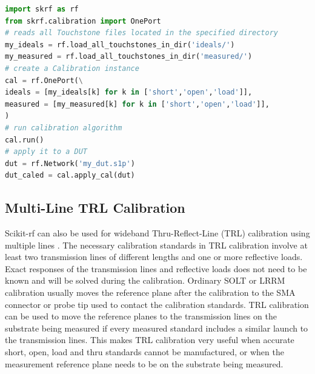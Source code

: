 \documentclass{IEEEjmw}
\begin{document}
\begin{lstlisting}[language=Python]
import skrf as rf
from skrf.calibration import OnePort
# reads all Touchstone files located in the specified directory
my_ideals = rf.load_all_touchstones_in_dir('ideals/')
my_measured = rf.load_all_touchstones_in_dir('measured/')
# create a Calibration instance
cal = rf.OnePort(\
ideals = [my_ideals[k] for k in ['short','open','load']],
measured = [my_measured[k] for k in ['short','open','load']],
)
# run calibration algorithm
cal.run()
# apply it to a DUT
dut = rf.Network('my_dut.s1p')
dut_caled = cal.apply_cal(dut)
\end{lstlisting}


\subsection{Multi-Line TRL Calibration}
Scikit-rf can also be used for wideband Thru-Reflect-Line (TRL) calibration using multiple lines \cite{marks1991}. The necessary calibration standards in TRL calibration involve at least two transmission lines of different lengths and one or more reflective loads. Exact responses of the transmission lines and reflective loads does not need to be known and will be solved during the calibration. Ordinary SOLT or LRRM \cite{davidson1990} calibration usually moves the reference plane after the calibration to the SMA connector or probe tip used to contact the calibration standards. TRL calibration can be used to move the reference planes to the transmission lines on the substrate being measured if every measured standard includes a similar launch to the transmission lines. This makes TRL calibration very useful when accurate short, open, load and thru standards cannot be manufactured, or when the measurement reference plane needs to be on the substrate being measured. 
\end{document}
